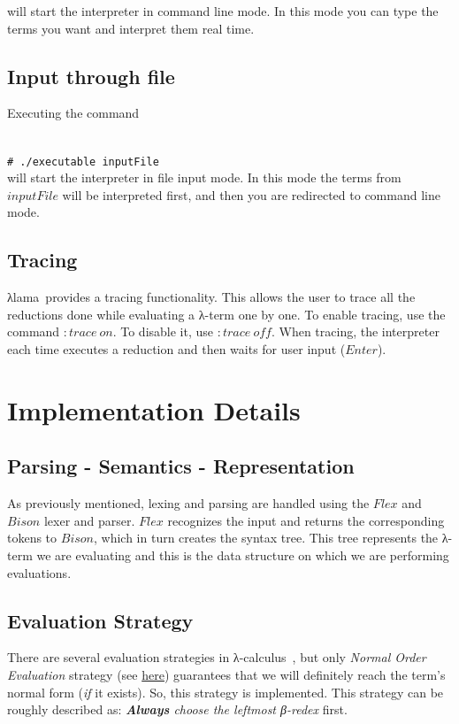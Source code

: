 \documentclass[a4paper]{article}
\newcommand{\shellcmd}[1]{\indent\indent\texttt{\footnotesize\# #1}}
\newcommand{\lc}{\textgreek{λ}-calculus\ }
\newcommand{\la}{\textgreek{λ}}
\newcommand{\intr}{\textgreek{λ}lama\ }
\begin{document}
will start the interpreter in command line mode. In this mode you can type the terms you want and interpret them real time.

\subsection{Input through file}

Executing the command 

~\\  
\shellcmd{./executable inputFile}
\\ 

will start the interpreter in file input mode. In this mode the terms from $inputFile$ will be interpreted first, and then you are redirected to command line mode.


\subsection{Tracing}

\intr provides a tracing functionality. This allows the user to trace all the reductions done while evaluating a \la-term one by one. To enable tracing, use the command $:trace\ on$. To disable it, use $:trace\ off$. When tracing, the interpreter each time executes a reduction and then waits for user input ($Enter$).

\section{Implementation Details}
\subsection{Parsing - Semantics - Representation}

As previously mentioned, lexing and parsing are handled using the $Flex$ and $Bison$ lexer and parser. $Flex$ recognizes the input and returns the corresponding tokens to $Bison$, which in turn creates the syntax tree. This tree represents the \la-term we are evaluating and this is the data structure on which we are performing evaluations.

\subsection{Evaluation Strategy}

There are several evaluation strategies in \lc, but only \textit{Normal Order Evaluation} strategy 
(see \href{http://en.wikipedia.org/wiki/Reduction_strategy\_\%28lambda\_calculus\%29}{here}) 
guarantees that we will definitely reach the term's normal form (\textit{if} it exists). So, this strategy is implemented. This strategy can be roughly described as: \textit{\textbf{Always} choose the leftmost \textgreek{β}-redex} first.
\end{document}
